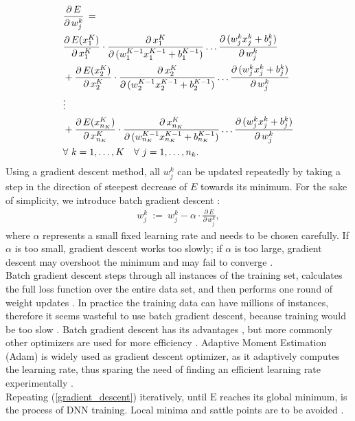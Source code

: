 \documentclass{article}
\begin{document}
\begin{align}
\notag
&\frac{\partial \, E}{\partial \, w_j^k} \, = \\
&\frac{\partial \, E(x_1^K)}{\partial \, x_1^K} \cdot \frac{\partial \, x_1^K}{\partial \, (w_1^{K-1} x_1^{K-1} + b_1^{K-1}) } \ldots \frac{\partial \, (w_j^k x_j^k + b_j^k)}{\partial \, w_j^k} \\ \notag
&+ \frac{\partial \, E(x_2^K)}{\partial \, x_2^K} \cdot \frac{\partial \, x_2^K}{\partial \, (w_2^{K-1} x_2^{K-1} + b_2^{K-1}) } \ldots \frac{\partial \, (w_j^k x_j^k + b_j^k)}{\partial \, w_j^k} \\ \notag
& \vdots \\ \notag
& + \frac{\partial \, E(x_{n_K}^K)}{\partial \, x_{n_K}^K} \cdot \frac{\partial \, x_{n_K}^K}{\partial \, (w_{n_K}^{K-1} x_{n_K}^{K-1} + b_{n_K}^{K-1}) } \ldots \frac{\partial \, (w_j^k x_j^k + b_j^k)}{\partial \, w_j^k}\\
& \forall \ k=1, \ldots , K \quad \forall \ j=1,\ldots,n_k.
\end{align}
Using a gradient descent method, all $w_j^k$ can be updated repeatedly by taking a step in the direction of steepest decrease of $E$ towards its minimum. For the sake of simplicity, we introduce batch gradient descent \cite{batch_gradient_descent}:
\begin{align} \label{gradient_descent}
w_j^k \ := \ w_j^k - \alpha \cdot \frac{\partial \, E}{\partial \, w_j^k},
\end{align}
where $\alpha$ represents a small fixed learning rate and needs to be chosen carefully. If $\alpha$ is too small, gradient descent works too slowly; if $\alpha$ is too large, gradient descent may overshoot the minimum and may fail to converge \cite{cs231:optimizers}.\\
Batch gradient descent steps through all instances of the training set, calculates the full loss function over the entire data set, and then performs one round of weight updates \cite{cs231:optimizers}. In practice the training data can have millions of instances, therefore it seems wasteful to use batch gradient descent, because training would be too slow \cite{cs231:optimizers}. Batch gradient descent has its advantages \cite{cs231:optimizers}, but more commonly other optimizers are used for more efficiency \cite{batch_gradient_descent}. Adaptive Moment Estimation (Adam) is widely used as gradient descent optimizer, as it adaptively computes the learning rate, thus sparing the need of finding an efficient learning rate experimentally \cite{batch_gradient_descent}.\\
Repeating (\ref{gradient_descent}) iteratively, until $\text{E}$ reaches its global minimum, is the process of DNN training. Local minima and sattle points are to be avoided \cite{local_minima}.
\end{document}
